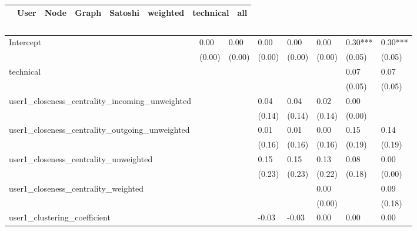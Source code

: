 \begin{table}
\caption{}
\begin{center}
\begin{tabular}{lccccccc}
\hline
                                               &   User  &   Node  &  Graph  & Satoshi & weighted & technical &   all    \\
\hline
\hline
\end{tabular}
\begin{tabular}{llllllll}
Intercept                                      & 0.00    & 0.00    & 0.00    & 0.00    & 0.00     & 0.30***   & 0.30***  \\
                                               & (0.00)  & (0.00)  & (0.00)  & (0.00)  & (0.00)   & (0.05)    & (0.05)   \\
technical                                      &         &         &         &         &          & 0.07      & 0.07     \\
                                               &         &         &         &         &          & (0.05)    & (0.05)   \\
user1_closeness_centrality_incoming_unweighted &         &         & 0.04    & 0.04    & 0.02     & 0.00      &          \\
                                               &         &         & (0.14)  & (0.14)  & (0.14)   & (0.00)    &          \\
user1_closeness_centrality_outgoing_unweighted &         &         & 0.01    & 0.01    & 0.00     & 0.15      & 0.14     \\
                                               &         &         & (0.16)  & (0.16)  & (0.16)   & (0.19)    & (0.19)   \\
user1_closeness_centrality_unweighted          &         &         & 0.15    & 0.15    & 0.13     & 0.08      & 0.00     \\
                                               &         &         & (0.23)  & (0.23)  & (0.22)   & (0.18)    & (0.00)   \\
user1_closeness_centrality_weighted            &         &         &         &         & 0.00     &           & 0.09     \\
                                               &         &         &         &         & (0.00)   &           & (0.18)   \\
user1_clustering_coefficient                   &         &         & -0.03   & -0.03   & 0.00     & 0.00      & 0.00     \\

\end{tabular}
\end{center}
\end{table}
